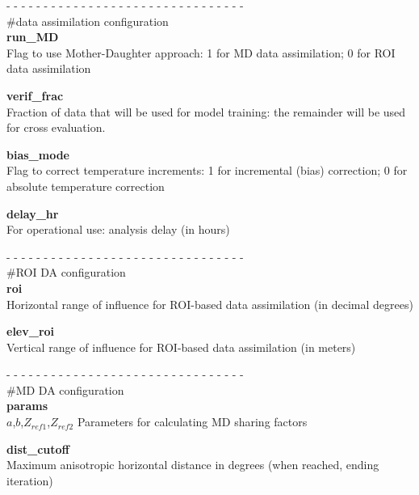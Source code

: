 \documentclass{article}
\begin{document}
\vspace{0.5cm}
\noindent- - - - - - - - - - - - - - - - - - - - - - - - - - - - - - - -\\
\noindent\#data assimilation configuration\\

\noindent \textbf{run\_MD}\\
Flag to use Mother-Daughter approach: 1 for MD data assimilation; 0 for ROI data assimilation

\vspace{0.1cm}
\noindent \textbf{verif\_frac}\\
Fraction of data that will be used for model training: the remainder will be used for cross evaluation. 

\vspace{0.1cm}
\noindent \textbf{bias\_mode}\\
Flag to correct temperature increments: 1 for incremental (bias) correction; 0 for absolute temperature correction

\vspace{0.1cm}
\noindent \textbf{delay\_hr}\\
For operational use: analysis delay (in hours)

\vspace{0.5cm}
\noindent- - - - - - - - - - - - - - - - - - - - - - - - - - - - - - - -\\
\noindent\#ROI DA configuration\\

\noindent \textbf{roi}\\
Horizontal range of influence for ROI-based data assimilation (in decimal degrees)

\vspace{0.1cm}
\noindent \textbf{elev\_roi}\\
Vertical range of influence for ROI-based data assimilation (in meters)



\vspace{0.5cm}
\noindent- - - - - - - - - - - - - - - - - - - - - - - - - - - - - - - -\\
\noindent\#MD DA configuration\\

\noindent \textbf{params}\\
$a$,$b$,$Z_{ref1}$,$Z_{ref2}$ Parameters for calculating MD sharing factors

\vspace{0.1cm}
\noindent \textbf{dist\_cutoff}\\
Maximum anisotropic horizontal distance in degrees (when reached, ending iteration)
\end{document}
